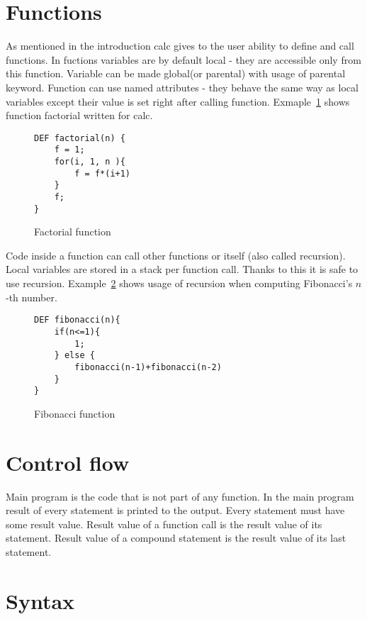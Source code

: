 \documentclass{article}
\begin{document}
\section{Functions}
As mentioned in the introduction calc gives to the user ability to define and
call functions. In fuctions variables are by default local - they
are accessible only from this function. Variable can be made global(or parental) with usage of parental
keyword. Function can use named attributes - they behave the same way as local 
variables except their value is set right after calling function. Exmaple~\ref{fig:example_factorial}
shows function factorial written for calc.
\begin{figure}[H]
	\begin{lstlisting}
DEF factorial(n) {
 	f = 1;
 	for(i, 1, n ){
	 	f = f*(i+1)
	}
	f;
}
	\end{lstlisting}
	\caption{Factorial function \label{fig:example_factorial}}
\end{figure}
Code inside a function
can call other functions or itself (also called recursion). Local variables are stored in a stack
per function call. Thanks to this it is safe to use recursion. Example~\ref{fig:example_fibonacci} 
shows usage of recursion when computing Fibonacci's $n$-th number.
\begin{figure}[H]
	\begin{lstlisting}
DEF fibonacci(n){
	if(n<=1){
		1;
	} else {
		fibonacci(n-1)+fibonacci(n-2)
	}
}
	\end{lstlisting}
	\caption{Fibonacci function \label{fig:example_fibonacci}}
\end{figure}
\section{Control flow}
Main program is the code that is not part of any function. In the main program result of
every statement is printed to the output. Every statement must have some result value. Result
value of a function call is the result value of its statement. Result value of a compound statement
is the result value of its last statement.
\section{Syntax}
\end{document}
